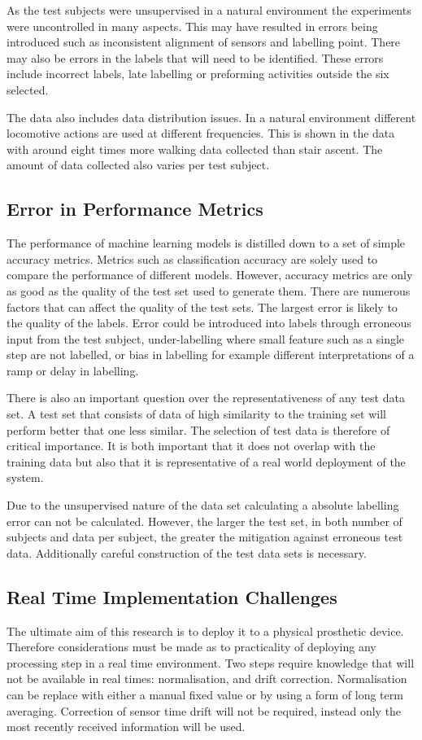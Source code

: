 As the test subjects were unsupervised in a natural environment the experiments were uncontrolled in many aspects. This may have resulted in errors being introduced such as inconsistent alignment of sensors and labelling point. There may also be errors in the labels that will need to be identified. These errors include incorrect labels, late labelling or preforming activities outside the six selected.

The data also includes data distribution issues. In a natural environment different locomotive actions are used at different frequencies. This is shown in the data with around eight times more walking data collected than stair ascent. The amount of data collected also varies per test subject.

\subsection{Error in Performance Metrics}
The performance of machine learning models is distilled down to a set of simple accuracy metrics. Metrics such as classification accuracy are solely used to compare the performance of different models. However, accuracy metrics are only as good as the quality of the test set used to generate them. There are numerous factors that can affect the quality of the test sets. The largest error is likely to the quality of the labels. Error could be introduced into labels through erroneous input from the test subject, under-labelling where small feature such as a single step are not labelled, or bias in labelling for example different interpretations of a ramp or delay in labelling.

There is also an important question over the representativeness of any test data set. A test set that consists of data of high similarity to the training set will perform better that one less similar. The selection of test data is therefore of critical importance. It is both important that it does not overlap with the training data but also that it is representative of a real world deployment of the system.

Due to the unsupervised nature of the data set calculating a absolute labelling error can not be calculated. However, the larger the test set, in both number of subjects and data per subject, the greater the mitigation against erroneous test data. Additionally careful construction of the test data sets is necessary.

\subsection{Real Time Implementation Challenges}
The ultimate aim of this research is to deploy it to a physical prosthetic device. Therefore considerations must be made as to practicality of deploying any processing step in a real time environment. Two steps require knowledge that will not be available in real times: normalisation, and drift correction. Normalisation can be replace with either a manual fixed value or by using a form of long term averaging. Correction of sensor time drift will not be required, instead only the most recently received information will be used.

